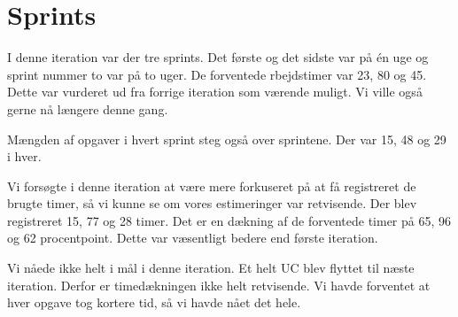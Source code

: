 \section{Sprints}

I denne iteration var der tre sprints. Det første og det sidste var på én uge og sprint nummer to var på to uger.
De forventede rbejdstimer var 23, 80 og 45. Dette var vurderet ud fra forrige iteration som værende muligt. Vi ville også gerne nå længere denne gang.

Mængden af opgaver i hvert sprint steg også over sprintene. Der var 15, 48 og 29 i hver.

Vi forsøgte i denne iteration at være mere forkuseret på at få registreret de brugte timer, så vi kunne se om vores estimeringer var retvisende. Der blev registreret 15, 77 og 28 timer. Det er en dækning af de forventede timer på 65, 96 og 62 procentpoint. Dette var væsentligt bedere end første iteration.

Vi nåede ikke helt i mål i denne iteration. Et helt UC blev flyttet til næste iteration. Derfor er timedækningen ikke helt retvisende. Vi havde forventet at hver opgave tog kortere tid, så vi havde nået det hele.